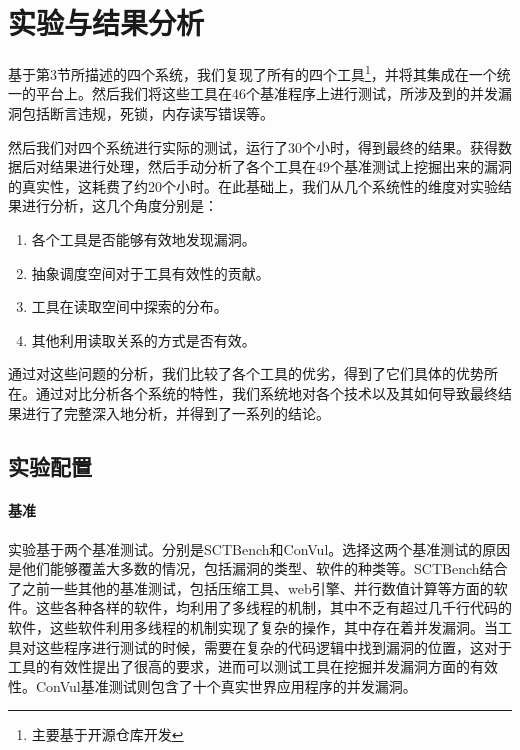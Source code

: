 \clearpage

\section{实验与结果分析}

基于第3节所描述的四个系统，我们复现了所有的四个工具\footnote{主要基于开源仓库\cite{figshareGreyboxFuzzing}开发}，并将其集成在一个统一的平台上。然后我们将这些工具在46个基准程序上进行测试，所涉及到的并发漏洞包括断言违规，死锁，内存读写错误等。

然后我们对四个系统进行实际的测试，运行了30个小时，得到最终的结果。获得数据后对结果进行处理，然后手动分析了各个工具在49个基准测试上挖掘出来的漏洞的真实性，这耗费了约20个小时。在此基础上，我们从几个系统性的维度对实验结果进行分析，这几个角度分别是：

\begin{enumerate}
\item 各个工具是否能够有效地发现漏洞。
\item 抽象调度空间对于工具有效性的贡献。
\item 工具在读取空间中探索的分布。
\item 其他利用读取关系的方式是否有效。
\end{enumerate}

通过对这些问题的分析，我们比较了各个工具的优劣，得到了它们具体的优势所在。通过对比分析各个系统的特性，我们系统地对各个技术以及其如何导致最终结果进行了完整深入地分析，并得到了一系列的结论。

\subsection{实验配置}

\paragraph{基准}实验基于两个基准测试。分别是SCTBench\cite{githubGitHubMcimperialsctbench, wen2022controlled}和ConVul\cite{cai2019detecting}。选择这两个基准测试的原因是他们能够覆盖大多数的情况，包括漏洞的类型、软件的种类等。SCTBench结合了之前一些其他的基准测试，包括压缩工具\cite{yu2009case}、web引擎\cite{jalbert2011radbench}、并行数值计算等方面的软件。这些各种各样的软件，均利用了多线程的机制，其中不乏有超过几千行代码的软件，这些软件利用多线程的机制实现了复杂的操作，其中存在着并发漏洞。当工具对这些程序进行测试的时候，需要在复杂的代码逻辑中找到漏洞的位置，这对于工具的有效性提出了很高的要求，进而可以测试工具在挖掘并发漏洞方面的有效性。ConVul基准测试则包含了十个真实世界应用程序的并发漏洞。

